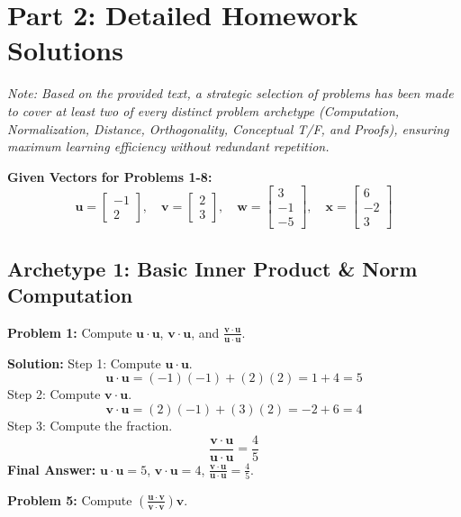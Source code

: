 \documentclass[11pt, letterpaper]{article}
\theoremstyle{definition}
\theoremstyle{remark}
\begin{document}
\newpage
\section{Part 2: Detailed Homework Solutions}

\textit{Note: Based on the provided text, a strategic selection of problems has been made to cover at least two of every distinct problem archetype (Computation, Normalization, Distance, Orthogonality, Conceptual T/F, and Proofs), ensuring maximum learning efficiency without redundant repetition.}

\textbf{Given Vectors for Problems 1-8:}
\[ \mathbf{u} = \begin{bmatrix} -1 \\ 2 \end{bmatrix}, \quad \mathbf{v} = \begin{bmatrix} 2 \\ 3 \end{bmatrix}, \quad \mathbf{w} = \begin{bmatrix} 3 \\ -1 \\ -5 \end{bmatrix}, \quad \mathbf{x} = \begin{bmatrix} 6 \\ -2 \\ 3 \end{bmatrix} \]

\subsection{Archetype 1: Basic Inner Product \& Norm Computation}

\textbf{Problem 1:} Compute $\mathbf{u} \cdot \mathbf{u}$, $\mathbf{v} \cdot \mathbf{u}$, and $\frac{\mathbf{v} \cdot \mathbf{u}}{\mathbf{u} \cdot \mathbf{u}}$.

\textbf{Solution:}
Step 1: Compute $\mathbf{u} \cdot \mathbf{u}$.
\[ \mathbf{u} \cdot \mathbf{u} = (-1)(-1) + (2)(2) = 1 + 4 = 5 \]
Step 2: Compute $\mathbf{v} \cdot \mathbf{u}$.
\[ \mathbf{v} \cdot \mathbf{u} = (2)(-1) + (3)(2) = -2 + 6 = 4 \]
Step 3: Compute the fraction.
\[ \frac{\mathbf{v} \cdot \mathbf{u}}{\mathbf{u} \cdot \mathbf{u}} = \frac{4}{5} \]
\textbf{Final Answer:} $\mathbf{u} \cdot \mathbf{u} = 5$, $\mathbf{v} \cdot \mathbf{u} = 4$, $\frac{\mathbf{v} \cdot \mathbf{u}}{\mathbf{u} \cdot \mathbf{u}} = \frac{4}{5}$.

\vspace{1em}
\textbf{Problem 5:} Compute $\left( \frac{\mathbf{u} \cdot \mathbf{v}}{\mathbf{v} \cdot \mathbf{v}} \right) \mathbf{v}$.
\end{document}
